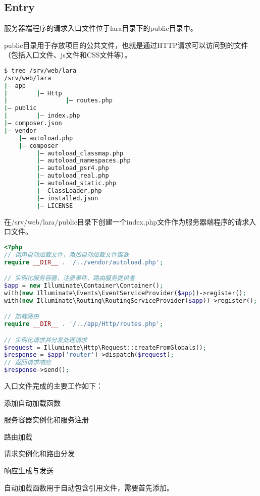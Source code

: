 \subsection{Entry}

服务器端程序的请求入口文件位于lara目录下的public目录中。

public目录用于存放项目的公共文件，也就是通过HTTP请求可以访问到的文件（包括入口文件、js文件和CSS文件等）。

\begin{lstlisting}[language=bash]
$ tree /srv/web/lara
/srv/web/lara
|— app
|        |— Http
|                |— routes.php
|— public
|        |— index.php
|— composer.json
|— vendor
    |— autoload.php
    |— composer
         |— autoload_classmap.php
         |— autoload_namespaces.php
         |— autoload_psr4.php
         |— autoload_real.php
         |— autoload_static.php
         |— ClassLoader.php
         |— installed.json
         |— LICENSE
\end{lstlisting}

在/srv/web/lara/public目录下创建一个index.php文件作为服务器端程序的请求入口文件。


\begin{lstlisting}[language=PHP]
<?php
// 调用自动加载文件，添加自动加载文件函数
require __DIR__ . '/../vendor/autoload.php';

// 实例化服务容器，注册事件、路由服务提供者
$app = new Illuminate\Container\Container();
with(new Illuminate\Events\EventServiceProvider($app))->register();
with(new Illuminate\Routing\RoutingServiceProvider($app))->register();

// 加载路由
require __DIR__ . '/../app/Http/routes.php';

// 实例化请求并分发处理请求
$request = Illuminate\Http\Request::createFromGlobals();
$response = $app['router']->dispatch($request);
// 返回请求响应
$response->send();
\end{lstlisting}

入口文件完成的主要工作如下：

\begin{compactitem}
\item 添加自动加载函数
\item 服务容器实例化和服务注册
\item 路由加载
\item 请求实例化和路由分发
\item 响应生成与发送
\end{compactitem}

自动加载函数用于自动包含引用文件，需要首先添加。



